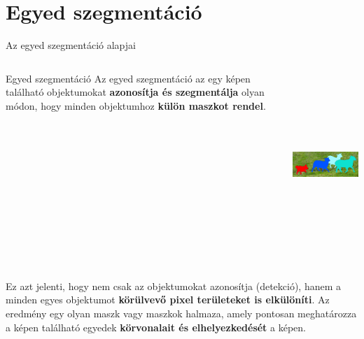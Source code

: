 \documentclass[english, aspectratio=169]{beamer}
\makeatletter
\let\origtableofcontents=\tableofcontents
\def\tableofcontents{\@ifnextchar[{\origtableofcontents}{\gobbletableofcontents}}
\def\gobbletableofcontents#1{\origtableofcontents}
\makeatother
\begin{document}
\section{Egyed szegmentáció}

\begin{frame}
\tableofcontents[currentsection]
\end{frame}

\begin{frame}{Az egyed szegmentáció alapjai}
\begin{columns}
\begin{column}{.5\textwidth}
\begin{block}{Egyed szegmentáció}
Az egyed szegmentáció az egy képen található objektumokat \textbf{azonosítja és szegmentálja} olyan módon, hogy minden objektumhoz \textbf{külön maszkot rendel}.
\end{block}
\end{column}
\begin{column}{.5\textwidth}
\begin{center}
\includegraphics[height=7cm, width=7cm, keepaspectratio]{images/instance_5.png}
\end{center}
\end{column}
\end{columns}
\vspace{0.5cm}
Ez azt jelenti, hogy nem csak az objektumokat azonosítja (detekció), hanem a minden egyes objektumot \textbf{körülvevő pixel területeket is elkülöníti}. Az eredmény egy olyan maszk vagy maszkok halmaza, amely pontosan meghatározza a képen található egyedek \textbf{körvonalait és elhelyezkedését} a képen. 
\end{frame}
\end{document}
